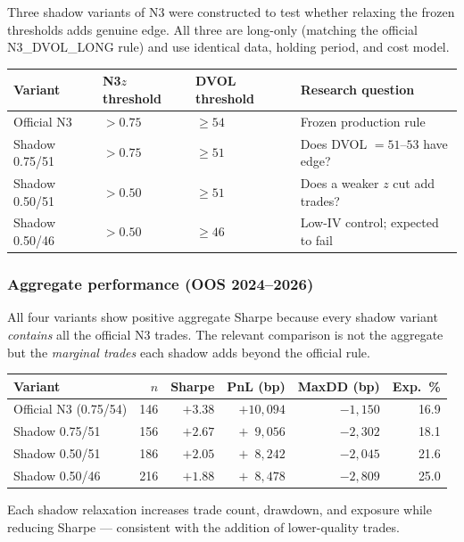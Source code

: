 \documentclass[12pt, a4paper]{article}
\theoremstyle{definition}
\begin{document}
Three shadow variants of N3 were constructed to test whether relaxing the
frozen thresholds adds genuine edge.  All three are long-only (matching the
official N3\_DVOL\_LONG rule) and use identical data, holding period, and cost
model.

\begin{center}
\begin{tabular}{llll}
\toprule
Variant & N3$z$ threshold & DVOL threshold & Research question \\
\midrule
Official N3   & $> 0.75$ & $\geq 54$ & Frozen production rule \\
Shadow 0.75/51 & $> 0.75$ & $\geq 51$ & Does DVOL $= 51$--$53$ have edge? \\
Shadow 0.50/51 & $> 0.50$ & $\geq 51$ & Does a weaker $z$ cut add trades? \\
Shadow 0.50/46 & $> 0.50$ & $\geq 46$ & Low-IV control; expected to fail \\
\bottomrule
\end{tabular}
\end{center}

\subsubsection*{Aggregate performance (OOS 2024--2026)}

All four variants show positive aggregate Sharpe because every shadow variant
\emph{contains} all the official N3 trades.  The relevant comparison is not the
aggregate but the \emph{marginal trades} each shadow adds beyond the official
rule.

\begin{center}
\begin{tabular}{lrrrrr}
\toprule
Variant & $n$ & Sharpe & PnL (bp) & MaxDD (bp) & Exp.\ \% \\
\midrule
Official N3 (0.75/54)  & 146 & $+3.38$ & $+10{,}094$ & $-1{,}150$ & 16.9 \\
Shadow 0.75/51         & 156 & $+2.67$ & $+\phantom{0}9{,}056$ & $-2{,}302$ & 18.1 \\
Shadow 0.50/51         & 186 & $+2.05$ & $+\phantom{0}8{,}242$ & $-2{,}045$ & 21.6 \\
Shadow 0.50/46         & 216 & $+1.88$ & $+\phantom{0}8{,}478$ & $-2{,}809$ & 25.0 \\
\bottomrule
\end{tabular}
\end{center}

Each shadow relaxation increases trade count, drawdown, and exposure while
reducing Sharpe --- consistent with the addition of lower-quality trades.
\end{document}
